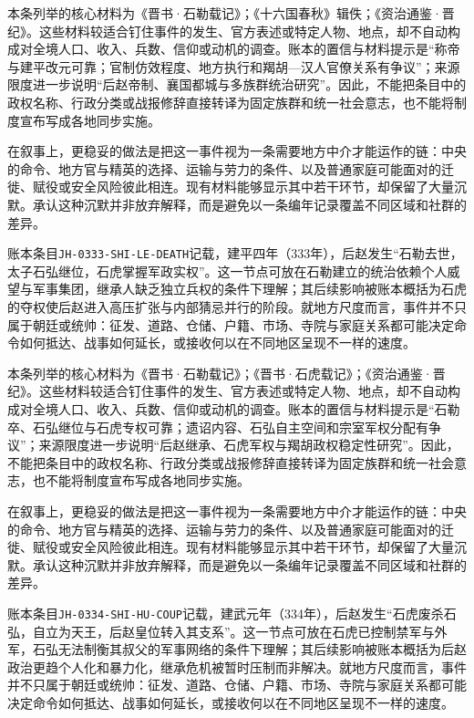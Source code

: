 本条列举的核心材料为《晋书·石勒载记》；《十六国春秋》辑佚；《资治通鉴·晋纪》。这些材料较适合钉住事件的发生、官方表述或特定人物、地点，却不自动构成对全境人口、收入、兵数、信仰或动机的调查。账本的置信与材料提示是“称帝与建平改元可靠；官制仿效程度、地方执行和羯胡—汉人官僚关系有争议”；来源限度进一步说明“后赵帝制、襄国都城与多族群统治研究”。因此，不能把条目中的政权名称、行政分类或战报修辞直接转译为固定族群和统一社会意志，也不能将制度宣布写成各地同步实施。

在叙事上，更稳妥的做法是把这一事件视为一条需要地方中介才能运作的链：中央的命令、地方官与精英的选择、运输与劳力的条件、以及普通家庭可能面对的迁徙、赋役或安全风险彼此相连。现有材料能够显示其中若干环节，却保留了大量沉默。承认这种沉默并非放弃解释，而是避免以一条编年记录覆盖不同区域和社群的差异。

账本条目\texttt{JH-0333-SHI-LE-DEATH}记载，建平四年（333年），后赵发生“石勒去世，太子石弘继位，石虎掌握军政实权”。这一节点可放在石勒建立的统治依赖个人威望与军事集团，继承人缺乏独立兵权的条件下理解；其后续影响被账本概括为石虎的夺权使后赵进入高压扩张与内部猜忌并行的阶段。就地方尺度而言，事件并不只属于朝廷或统帅：征发、道路、仓储、户籍、市场、寺院与家庭关系都可能决定命令如何抵达、战事如何延长，或接收何以在不同地区呈现不一样的速度。

本条列举的核心材料为《晋书·石勒载记》；《晋书·石虎载记》；《资治通鉴·晋纪》。这些材料较适合钉住事件的发生、官方表述或特定人物、地点，却不自动构成对全境人口、收入、兵数、信仰或动机的调查。账本的置信与材料提示是“石勒卒、石弘继位与石虎专权可靠；遗诏内容、石弘自主空间和宗室军权分配有争议”；来源限度进一步说明“后赵继承、石虎军权与羯胡政权稳定性研究”。因此，不能把条目中的政权名称、行政分类或战报修辞直接转译为固定族群和统一社会意志，也不能将制度宣布写成各地同步实施。

在叙事上，更稳妥的做法是把这一事件视为一条需要地方中介才能运作的链：中央的命令、地方官与精英的选择、运输与劳力的条件、以及普通家庭可能面对的迁徙、赋役或安全风险彼此相连。现有材料能够显示其中若干环节，却保留了大量沉默。承认这种沉默并非放弃解释，而是避免以一条编年记录覆盖不同区域和社群的差异。

账本条目\texttt{JH-0334-SHI-HU-COUP}记载，建武元年（334年），后赵发生“石虎废杀石弘，自立为天王，后赵皇位转入其支系”。这一节点可放在石虎已控制禁军与外军，石弘无法制衡其叔父的军事网络的条件下理解；其后续影响被账本概括为后赵政治更趋个人化和暴力化，继承危机被暂时压制而非解决。就地方尺度而言，事件并不只属于朝廷或统帅：征发、道路、仓储、户籍、市场、寺院与家庭关系都可能决定命令如何抵达、战事如何延长，或接收何以在不同地区呈现不一样的速度。

